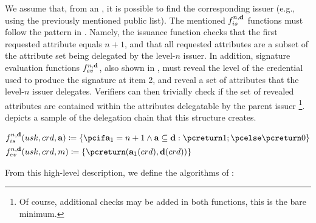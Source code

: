 We assume that, from an \ipk, it is possible to find the corresponding issuer
(e.g., using the previously mentioned public list). The mentioned
$f_{is}^{n,\mathbf{d}}$ functions must follow the pattern in .
Namely, the issuance function checks that the first requested attribute equals
$n+1$, and that all requested attributes are a subset of the attribute set
\dattrs being delegated by the level-$n$ issuer. In addition, signature
evaluation functions $f_{ev}^{n,\mathbf{d}}$, also shown in ,
must reveal the level of the credential used to produce the \UAS signature at
item 2, and reveal a set of attributes \dattrs that the level-$n$ issuer
delegates. Verifiers can then trivially check if the set of revealed attributes
are contained within the attributes delegatable by the parent issuer%
\footnote{Of course, additional checks may be added in both functions, this is
  the bare minimum.}.  depicts a sample of the delegation chain
that this structure creates.
 
\begin{align}
  & \fissue^{n,\dattrs}(\usk,\cred,\attrs) \coloneqq \lbrace
    \pcif \attrs_1 = n+1 \land \attrs \subseteq \dattrs: \pcreturn 1; \pcelse \pcreturn 0
    \rbrace \nonumber \\
  & \feval^{n,\dattrs}(\usk,\cred,\msg) \coloneqq \lbrace
    \pcreturn (\attrs_1(\cred),\dattrs(\cred)) \rbrace
  \label{eq:funcs-dac}
\end{align}

From this high-level description, we define the algorithms of \CUASDAC:


